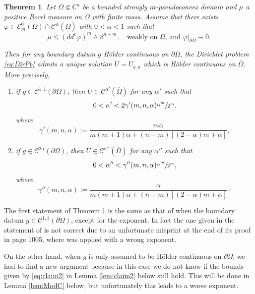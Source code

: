\documentclass[JEP,XML,SOM,Unicode]{cedram}
\newtheorem{theoremB}{Theorem}
\theoremstyle{definition}
\newcommand{\C}{\mathbb{C}}
\begin{document}
\begin{theoremB}\label{th:B'}
Let $\Omega \Subset \C^n$ be a bounded strongly $m$-pseudoconvex domain and $\mu $ a positive Borel measure on $\Omega$ with finite mass. Assume that there exists \hbox{$\varphi\in \mathcal{E}^0_m(\Omega)\cap\mathcal{C}^{\alpha}(\overline\Omega)$} with $0 < \alpha < 1$ such that
\begin{equation} \label{eq:subsol}
\mu \leq (dd^c\varphi)^m\wedge\beta^{n-m}, \quad \text{weakly on $\Omega$, and $\varphi|_{\partial \Omega} \equiv 0$.}
\end{equation}

Then for any boundary datum $g $ Hölder continuous on $\partial \Omega$, the Dirichlet problem \eqref{eq:DirPb} admits a unique solution $U = U_{g,\mu} $ which is Hölder continuous on $\bar{\Omega}$.
More precisely,
\begin{enumerate}
\item
if $g \in \mathcal C^{1,1} (\partial \Omega)$, then $ U \in \mathcal{C}^{\alpha'}(\overline\Omega)$ for any $\alpha'$ such that
\[
0 < \alpha' < 2 \gamma' (m,n,\alpha) \sfrac{\alpha^m}{2^{m}},
\]
where
\begin{equation} \label{eq:gamma'}
\gamma' (m,n,\alpha) := \frac{ m \alpha}{ m (m + 1) \alpha + (n-m) [(2 - \alpha)m + \alpha]},
\end{equation}

\item
if $g \in \mathcal C^{2 \alpha} (\partial \Omega)$, then $ U \in \mathcal{C}^{\alpha''}(\overline\Omega)$ for any $\alpha''$ such that
\[
0 < \alpha'' < \gamma'' (m,n,\alpha) \sfrac{\alpha^m}{2^{m}},
\]
where
\begin{equation} \label{eq:gamma''}
\gamma'' (m,n,\alpha) := \frac{\alpha}{ m (m + 1) \alpha + (n-m) [(2 - \alpha)m + \alpha]}\cdot
\end{equation}
\end{enumerate}
\end{theoremB}

The first statement of Theorem \ref{th:B'} is the same as that of \cite[Th.\,B]{BZ20} when the boundary datum $g \in \mathcal C^{1,1} (\partial \Omega)$, except for the exponent.
In fact the one given in the statement of \cite[Th.\,B]{BZ20} is not correct due to an unfortunate misprint at the end of its proof in page 1005, where \cite[Prop.\,2.20]{BZ20} was applied with a wrong exponent.

On the other hand, when $g$ is only assumed to be Hölder continuous on $\partial \Omega$, we had to find a new argument because in this case we do not know if the bounds given by \eqref{eq:claim2} in Lemma \ref{lem:claim2} below still hold. This will be done in Lemma \ref{lem:ModC} below, but unfortunately this leads to a worse exponent.
\end{document}
